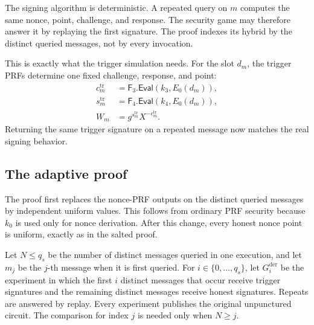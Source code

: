 \documentclass[11pt]{article}
\newcommand{\Eval}{\mathsf{Eval}}
\begin{document}
The signing algorithm is deterministic.  A repeated query on \(m\) computes
the same nonce, point, challenge, and response.  The security game may
therefore answer it by replaying the first signature.  The proof indexes its
hybrid by the distinct queried messages, not by every invocation.

This is exactly what the trigger simulation needs.  For the slot \(d_m\),
the trigger PRFs determine one fixed challenge, response, and point:
\[
\begin{aligned}
  c^{\mathrm{tr}}_m
    &=\mathsf{F}_3.\Eval(k_3,E_0(d_m)),\\
  s^{\mathrm{tr}}_m
    &=\mathsf{F}_4.\Eval(k_4,E_0(d_m)),\\
  W_m
    &=g^{s^{\mathrm{tr}}_m}X^{-c^{\mathrm{tr}}_m}.
\end{aligned}
\]
Returning the same trigger signature on a repeated message now matches the
real signing behavior.

\subsection{The adaptive proof}

The proof first replaces the nonce-PRF outputs on the distinct queried
messages by independent uniform values.  This follows from ordinary PRF
security because \(k_0\) is used only for nonce derivation.  After this
change, every honest nonce point is uniform, exactly as in the salted proof.

Let \(N\le q_s\) be the number of distinct messages queried in one execution,
and let \(m_j\) be the \(j\)-th message when it is first queried.  For
\(i\in\{0,\ldots,q_s\}\), let \(G_i^{\mathrm{der}}\) be the experiment in
which the first \(i\) distinct messages that occur receive trigger signatures
and the remaining distinct messages receive honest signatures.  Repeats are
answered by replay.  Every experiment publishes the original unpunctured
circuit.  The comparison for index \(j\) is needed only when \(N\ge j\).
\end{document}

